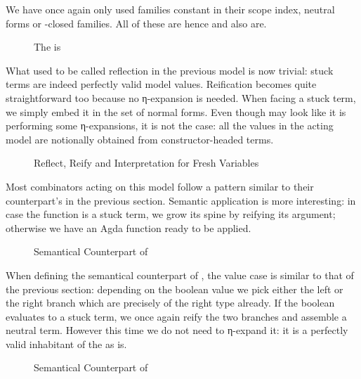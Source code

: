 We have once again only used families constant in their scope index, neutral forms or
-closed families. All of these are  hence  and 
also are.

\begin{figure}[h]
\caption{The  is }
\end{figure}

What used to be called reflection in the previous model is now trivial:
stuck terms are indeed perfectly valid model values. Reification becomes
quite straightforward too because no η-expansion is needed. When facing
a stuck term, we simply embed it in the set of normal forms. Even though
 may look like it is performing some η-expansions, it is not
the case: all the values in the acting model are notionally obtained
from constructor-headed terms.

\begin{figure}[h]
\caption{Reflect, Reify and Interpretation for Fresh Variables}
\end{figure}

Most combinators acting on this model follow a pattern similar to their
counterpart's in the previous section. Semantic application is
more interesting: in case the function is a stuck term, we grow its
spine by reifying its argument; otherwise we have an Agda function ready
to be applied.

\begin{figure}[h]
\caption{Semantical Counterpart of }
\end{figure}

When defining the semantical counterpart of , the value case is similar to
that of the previous section: depending on the boolean value we pick either the left
or the right branch which are precisely of the right type already. If the boolean
evaluates to a stuck term, we once again reify the two branches and assemble a neutral
term. However this time we do not need to η-expand it: it is a perfectly valid inhabitant
of the  as is.

\begin{figure}[h]
\caption{Semantical Counterpart of }
\end{figure}

